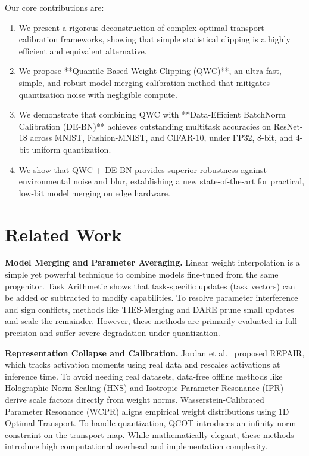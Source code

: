 \documentclass{article}
\theoremstyle{plain}
\theoremstyle{definition}
\theoremstyle{remark}
\begin{document}
Our core contributions are:
\begin{enumerate}
    \item We present a rigorous deconstruction of complex optimal transport calibration frameworks, showing that simple statistical clipping is a highly efficient and equivalent alternative.
    \item We propose **Quantile-Based Weight Clipping (QWC)**, an ultra-fast, simple, and robust model-merging calibration method that mitigates quantization noise with negligible compute.
    \item We demonstrate that combining QWC with **Data-Efficient BatchNorm Calibration (DE-BN)** achieves outstanding multitask accuracies on ResNet-18 across MNIST, Fashion-MNIST, and CIFAR-10, under FP32, 8-bit, and 4-bit uniform quantization.
    \item We show that QWC + DE-BN provides superior robustness against environmental noise and blur, establishing a new state-of-the-art for practical, low-bit model merging on edge hardware.
\end{enumerate}

\section{Related Work}
\textbf{Model Merging and Parameter Averaging.} Linear weight interpolation is a simple yet powerful technique to combine models fine-tuned from the same progenitor. Task Arithmetic \cite{ilharco23} shows that task-specific updates (task vectors) can be added or subtracted to modify capabilities. To resolve parameter interference and sign conflicts, methods like TIES-Merging \cite{yadav23} and DARE \cite{jin23} prune small updates and scale the remainder. However, these methods are primarily evaluated in full precision and suffer severe degradation under quantization.

\textbf{Representation Collapse and Calibration.} Jordan et al.\ \cite{jordan23} proposed REPAIR, which tracks activation moments using real data and rescales activations at inference time. To avoid needing real datasets, data-free offline methods like Holographic Norm Scaling (HNS) and Isotropic Parameter Resonance (IPR) derive scale factors directly from weight norms. Wasserstein-Calibrated Parameter Resonance (WCPR) aligns empirical weight distributions using 1D Optimal Transport. To handle quantization, QCOT \cite{paper9} introduces an infinity-norm constraint on the transport map. While mathematically elegant, these methods introduce high computational overhead and implementation complexity.
\end{document}
